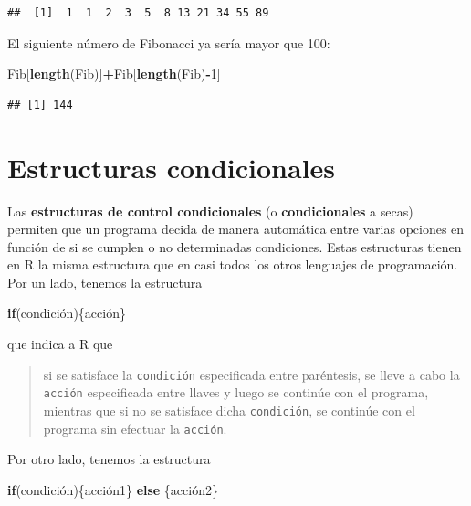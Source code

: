 \documentclass[]{book}
\newenvironment{Shaded}{\begin{snugshade}}{\end{snugshade}}
\newcommand{\ControlFlowTok}[1]{\textcolor[rgb]{0.13,0.29,0.53}{\textbf{#1}}}
\newcommand{\DecValTok}[1]{\textcolor[rgb]{0.00,0.00,0.81}{#1}}
\newcommand{\KeywordTok}[1]{\textcolor[rgb]{0.13,0.29,0.53}{\textbf{#1}}}
\newcommand{\NormalTok}[1]{#1}
\newcommand{\OperatorTok}[1]{\textcolor[rgb]{0.81,0.36,0.00}{\textbf{#1}}}
\theoremstyle{definition}
\theoremstyle{definition}
\theoremstyle{definition}
\theoremstyle{remark}
\begin{document}
\begin{verbatim}
##  [1]  1  1  2  3  5  8 13 21 34 55 89
\end{verbatim}

El siguiente número de Fibonacci ya sería mayor que 100:

\begin{Shaded}
\begin{Highlighting}[]
\NormalTok{Fib[}\KeywordTok{length}\NormalTok{(Fib)]}\OperatorTok{+}\NormalTok{Fib[}\KeywordTok{length}\NormalTok{(Fib)}\OperatorTok{-}\DecValTok{1}\NormalTok{]}
\end{Highlighting}
\end{Shaded}

\begin{verbatim}
## [1] 144
\end{verbatim}

\hypertarget{estructuras-condicionales}{%
\section{Estructuras condicionales}\label{estructuras-condicionales}}

Las \textbf{estructuras de control condicionales} (o \textbf{condicionales} a secas) permiten que un programa decida de manera automática entre varias opciones en función de si se cumplen o no determinadas condiciones. Estas estructuras tienen en R la misma estructura que en casi todos los otros lenguajes de programación. Por un lado, tenemos la estructura

\begin{Shaded}
\begin{Highlighting}[]
\ControlFlowTok{if}\NormalTok{(condición)\{acción\}}
\end{Highlighting}
\end{Shaded}

que indica a R que

\begin{quote}
si se satisface la \texttt{condición} especificada entre paréntesis, se lleve a cabo la \texttt{acción} especificada entre llaves y luego se continúe con el programa, mientras que si no se satisface dicha \texttt{condición}, se continúe con el programa sin efectuar la \texttt{acción}.
\end{quote}

Por otro lado, tenemos la estructura

\begin{Shaded}
\begin{Highlighting}[]
\ControlFlowTok{if}\NormalTok{(condición)\{acción1\} }\ControlFlowTok{else}\NormalTok{ \{acción2\}}
\end{Highlighting}
\end{Shaded}
\end{document}
